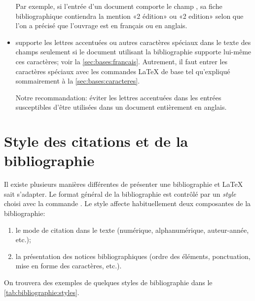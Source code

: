 \begin{itemize}
  Par exemple, si l'entrée d'un document comporte le champ
  , sa fiche bibliographique contiendra la mention
  «2{\ieme} édition» ou «2 edition» selon que l'on a précisé
  que l'ouvrage est en français ou en anglais.
\item {\BibTeX} supporte les lettres accentuées ou autres caractères
  spéciaux dans le texte des champs seulement si le document utilisant
  la bibliographie supporte lui-même ces caractères; voir la
  \autoref{sec:bases:francais}. Autrement, il faut entrer les
  caractères spéciaux avec les commandes {\LaTeX} de base tel
  qu'expliqué sommairement à la \autoref{sec:bases:caracteres}.

  Notre recommandation: éviter les lettres accentuées dans les
  entrées susceptibles d'être utilisées dans un document entièrement
  en anglais.
\end{itemize}




\section{Style des citations et de la bibliographie}
\label{sec:bibliographie:style}

Il existe plusieurs manières différentes de présenter une
bibliographie et {\LaTeX} sait s'adapter. Le format général de la
bibliographie est contrôlé par un \emph{style} choisi avec la commande
\cmd{}. Le style affecte habituellement deux
composantes de la bibliographie:
\begin{enumerate}
\item le mode de citation dans le texte (numérique, alphanumérique,
  auteur-année, etc.);
\item la présentation des notices bibliographiques (ordre des
  éléments, ponctuation, mise en forme des caractères, etc.).
\end{enumerate}
On trouvera des exemples de quelques styles de bibliographie dans le
\autoref{tab:bibliographie:styles}.

